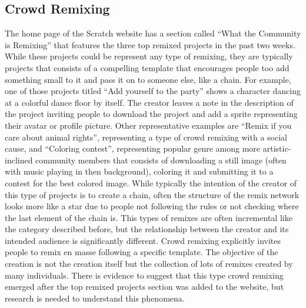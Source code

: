\subsection{Crowd Remixing}
The home page of the Scratch website has a section called ``What the Community is Remixing''  that features the three top remixed projects in the past two weeks.
While these projects could be represent any type of remixing, they are typically projects that consists of a compelling template that encourages people too add something small to it and pass it on to someone else, like a chain.
For example, one of those projects titled ``Add yourself to the party'' shows a character dancing at a colorful dance floor by itself.
The creator leaves a note in the description of the project inviting people to download the project and add a sprite representing their avatar or profile picture.
Other representative examples are ``Remix if you care about animal rights'', representing a type of crowd remixing with a social cause, and ``Coloring contest'', representing popular genre among more artistic-inclined community members that consists of downloading a still image (often with music playing in then background), coloring it and submitting it to a contest for the best colored image.
While typically the intention of the creator of this type of projects is to create a chain, often the structure of the remix network looks more like a star due to people not following the rules or not checking where the last element of the chain is.
This types of remixes are often incremental like the category described before, but the relationship between the creator and its intended audience is significantly different. 
Crowd remixing explicitly invites people to remix en masse following a specific template. 
The objective of the creation is not the creation itself but the collection of lots of remixes created by many individuals.
There is evidence to suggest that this type crowd remixing emerged after the top remixed projects section was added to the website, but research is needed to understand this phenomena.
